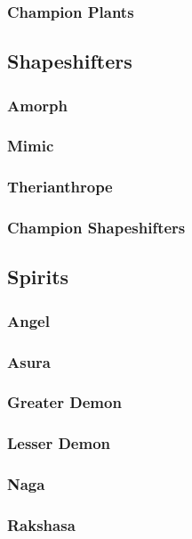 \subsubsection{Champion Plants}

\subsection{Shapeshifters}
\begin{multicols}{2}
    \subsubsection*{Amorph}\label{foe:amorph}
    \subsubsection*{Mimic}\label{foe:mimic}
    \subsubsection*{Therianthrope}\label{foe:therianthrope}
\end{multicols}
\subsubsection{Champion Shapeshifters}

\subsection{Spirits}
\begin{multicols}{2}
    \subsubsection*{Angel}\label{foe:angel}
    \subsubsection*{Asura}\label{foe:asura}
    \subsubsection*{Greater Demon}\label{foe:greater-demon}
    \subsubsection*{Lesser Demon}\label{foe:lesser-demon}
    \subsubsection*{Naga}\label{foe:naga}
    \subsubsection*{Rakshasa}\label{foe:rakshasa}
\end{multicols}

